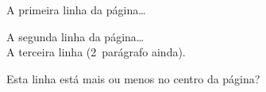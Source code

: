 \documentclass[a4paper,12pt]{article}
\begin{document}
	
	A primeira linha da página\dots
	
	\vspace{2cm}
	
	A segunda linha da página\dots\\[0.5cm]
	A terceira linha (2\textordmasculine\ parágrafo ainda).




	\newpage
	
	
	
	
	\vspace{10cm} %
	Esta linha está mais ou menos no centro da página?
\end{document}
